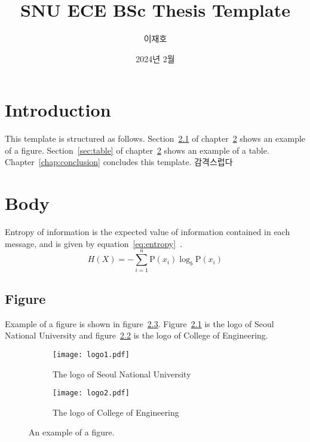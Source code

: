 \documentclass[en]{snu-ece-bsc-thesis}
\title{SNU ECE BSc Thesis Template}
\author{이재호}
\date{2024년 2월}
\begin{document}
\maketitle

\begin{abstract}
  \lipsum[1]
\end{abstract}

\tableofcontents
\listoftables
\listoffigures

\chapter{Introduction}\label{chap:introduction}
This template is structured as follows.
Section~\ref{sec:figure} of chapter~\ref{chap:body} shows an example of a figure.
Section~\ref{sec:table} of chapter~\ref{chap:body} shows an example of a table.
Chapter~\ref{chap:conclusion} concludes this template.
감격스럽다


\chapter{Body}\label{chap:body}
Entropy of information is the expected value of information contained in each message, and is given by equation~\eqref{eq:entropy}~\cite{6773024}.
\begin{equation}\label{eq:entropy}
  H(X) = -\sum_{i=1}^n {\mathrm{P}(x_i) \log_b \mathrm{P}(x_i)}
\end{equation}

\lipsum[4-6]


\section{Figure}\label{sec:figure}
Example of a figure is shown in figure~\ref{fig:example}.
Figure~\ref{fig:snu} is the logo of Seoul National University and figure~\ref{fig:eng} is the logo of College of Engineering.

\begin{figure}[htp]
  \centering
  \begin{subfigure}[b]{0.5\textwidth}
    \centering
    \texttt{[image: logo1.pdf]}
    \caption{The logo of Seoul National University}\label{fig:snu}
  \end{subfigure}%
  \begin{subfigure}[b]{0.5\textwidth}
    \centering
    \texttt{[image: logo2.pdf]}
    \caption{The logo of College of Engineering}\label{fig:eng}
  \end{subfigure}
  \caption[Figure example (ToC)]{An example of a figure.}\label{fig:example}
\end{figure}
\end{document}
